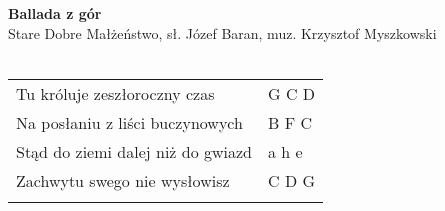 \documentclass[a5paper]{article}
\begin{document}


\noindent
\fontsize{12pt}{15pt}\selectfont
\textbf{Ballada z gór} \\
\fontsize{8pt}{10pt}\selectfont
Stare Dobre Małżeństwo,  sł. Józef Baran, muz. Krzysztof Myszkowski \\ \\
\fontsize{10pt}{12pt}\selectfont

\begin{tabular}{@{}p{8cm}p{3cm}@{}}
\noindent
Tu króluje zeszłoroczny czas & G C D \\
Na posłaniu z liści buczynowych & B F C \\
Stąd do ziemi dalej niż do gwiazd & a h e \\
Zachwytu swego nie wysłowisz & C D G \\ \\
\end{tabular}
\end{document}
